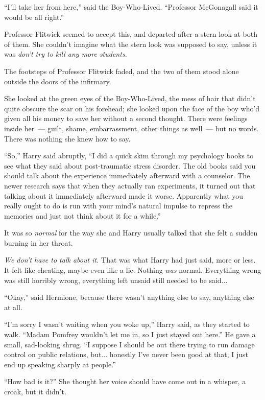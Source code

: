 ``I'll take her from here,'' said the Boy-Who-Lived. ``Professor McGonagall said it would be all right.''

Professor Flitwick seemed to accept this, and departed after a stern look at both of them. She couldn't imagine what the stern look was supposed to say, unless it was \emph{don't try to kill any more students.}

The footsteps of Professor Flitwick faded, and the two of them stood alone outside the doors of the infirmary.

She looked at the green eyes of the Boy-Who-Lived, the mess of hair that didn't quite obscure the scar on his forehead; she looked upon the face of the boy who'd given all his money to save her without a second thought. There were feelings inside her~--- guilt, shame, embarrassment, other things as well~--- but no words. There was nothing she knew how to say.

``So,'' Harry said abruptly, ``I did a quick skim through my psychology books to see what they said about post-traumatic stress disorder. The old books said you should talk about the experience immediately afterward with a counselor. The newer research says that when they actually ran experiments, it turned out that talking about it immediately afterward made it worse. Apparently what you really ought to do is run with your mind's natural impulse to repress the memories and just not think about it for a while.''

It was so \emph{normal} for the way she and Harry usually talked that she felt a sudden burning in her throat.

\emph{We don't have to talk about it.} That was what Harry had just said, more or less. It felt like cheating, maybe even like a lie. Nothing \emph{was} normal. Everything wrong was still horribly wrong, everything left unsaid still needed to be said...

``Okay,'' said Hermione, because there wasn't anything else to say, anything else at all.

``I'm sorry I wasn't waiting when you woke up,'' Harry said, as they started to walk. ``Madam Pomfrey wouldn't let me in, so I just stayed out here.'' He gave a small, sad-looking shrug. ``I suppose I should be out there trying to run damage control on public relations, but... honestly I've never been good at that, I just end up speaking sharply at people.''

``How bad is it?'' She thought her voice should have come out in a whisper, a croak, but it didn't.

